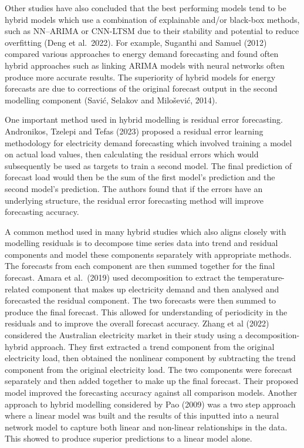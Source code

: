 \documentclass[mstat,12pt]{unswthesis}
\begin{document}
\bigskip

Other studies have also concluded that the best performing models tend to be hybrid models which use a combination of explainable and/or black-box methods, such as NN--ARIMA or CNN-LTSM due to their stability and potential to reduce overfitting (Deng et al.~2022). For example, Suganthi and Samuel (2012) compared various approaches to energy demand forecasting and found often hybrid approaches such as linking ARIMA models with neural networks often produce more accurate results. The superiority of hybrid models for energy forecasts are due to corrections of the original forecast output in the second modelling component (Savić, Selakov and Milošević, 2014).

\bigskip

One important method used in hybrid modelling is residual error forecasting. Andronikos, Tzelepi and Tefas (2023) proposed a residual error learning methodology for electricity demand forecasting which involved training a model on actual load values, then calculating the residual errors which would subsequently be used as targets to train a second model. The final prediction of forecast load would then be the sum of the first model's prediction and the second model's prediction. The authors found that if the errors have an underlying structure, the residual error forecasting method will improve forecasting accuracy.

\bigskip

A common method used in many hybrid studies which also aligns closely with modelling residuals is to decompose time series data into trend and residual components and model these components separately with appropriate methods. The forecasts from each component are then summed together for the final forecast. Amara et al.~(2019) used decomposition to extract the temperature-related component that makes up electricity demand and then analysed and forecasted the residual component. The two forecasts were then summed to produce the final forecast. This allowed for understanding of periodicity in the residuals and to improve the overall forecast accuracy. Zhang et al (2022) considered the Australian electricity market in their study using a decomposition-hybrid approach. They first extracted a trend component from the original electricity load, then obtained the nonlinear component by subtracting the trend component from the original electricity load. The two components were forecast separately and then added together to make up the final forecast. Their proposed model improved the forecasting accuracy against all comparison models. Another approach to hybrid modelling considered by Pao (2009) was a two step approach where a linear model was built and the results of this inputted into a neural network model to capture both linear and non-linear relationships in the data. This showed to produce superior predictions to a linear model alone.
\end{document}
